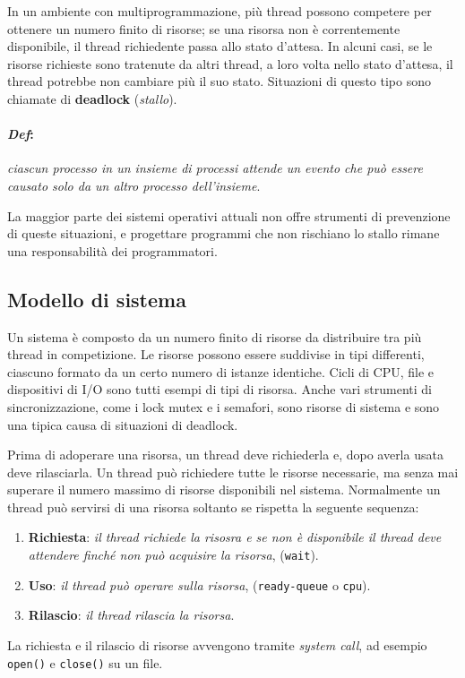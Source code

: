\documentclass[a4paper,12pt, twoside]{report}
\newcommand{\defbox}[1]{\noindent\colorbox{shadecolor}
{\parbox{\dimexpr\textwidth-2\fboxsep\relax}{#1}}}
\begin{document}
In un ambiente con multiprogrammazione, pi\`u thread possono competere per ottenere un numero finito di risorse; se una
risorsa non \`e correntemente disponibile, il thread richiedente passa allo stato d'attesa. In alcuni casi, se le risorse
richieste sono tratenute da altri thread, a loro volta nello stato d'attesa, il thread potrebbe non cambiare pi\`u il suo
stato. Situazioni di questo tipo sono chiamate di \textbf{deadlock} (\emph{stallo}).

\paragraph{\emph{Def}:}
\begin{center}
\defbox{\emph{ciascun processo in un insieme di processi attende un evento che pu\`o essere causato solo da un altro processo dell'insieme}.}
\end{center}


La maggior parte dei sistemi operativi attuali non offre strumenti di prevenzione di queste situazioni, e progettare
programmi che non rischiano lo stallo rimane una responsabilit\`a dei programmatori.

\subsection{Modello di sistema}

Un sistema \`e composto da un numero finito di risorse da distribuire tra pi\`u thread in competizione. Le risorse
possono essere suddivise in tipi differenti, ciascuno formato da un certo numero di istanze identiche. Cicli di CPU,
file e dispositivi di I/O sono tutti esempi di tipi di risorsa.
Anche vari strumenti di sincronizzazione, come i lock mutex e i semafori, sono risorse di sistema e sono una tipica
causa di situazioni di deadlock.

Prima di adoperare una risorsa, un thread deve richiederla e, dopo averla usata deve rilasciarla. Un thread pu\`o
richiedere tutte le risorse necessarie, ma senza mai superare il numero massimo di risorse disponibili nel sistema.
Normalmente un thread pu\`o servirsi di una risorsa soltanto se rispetta la seguente sequenza:
\begin{enumerate}
\item \textbf{Richiesta}: \emph{il thread richiede la risosra e se non \`e disponibile il thread deve attendere finch\'e
non pu\`o acquisire la risorsa}, (\texttt{wait}).
\item \textbf{Uso}: \emph{il thread pu\`o operare sulla risorsa}, (\texttt{ready-queue} o \texttt{cpu}).
\item \textbf{Rilascio}: \emph{il thread rilascia la risorsa}.
\end{enumerate}
La richiesta e il rilascio di risorse avvengono tramite \emph{system call}, ad esempio \texttt{open()} e \texttt{close()} su un file.
\end{document}
